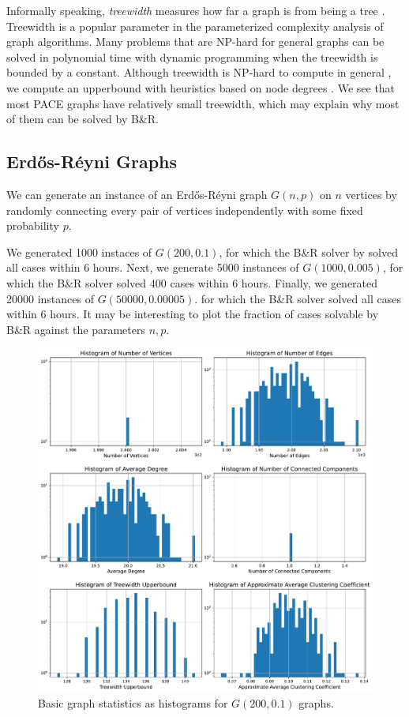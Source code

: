 \documentclass{article}
\begin{document}
Informally speaking, \emph{treewidth} measures how far a graph is from being a tree \citet{robertson1986graph}.
Treewidth is a popular parameter in the parameterized complexity analysis of graph algorithms.
Many problems that are NP-hard for general graphs can be solved in polynomial time
with dynamic programming
when the treewidth is bounded by a constant.
Although treewidth is NP-hard to compute in general \citet{treewidth_hardness},
we compute an upperbound with heuristics based on node degrees \citet{bodlaender2010treewidth}.
We see that most PACE graphs have relatively small treewidth,
which may explain why most of them can be solved by B\&R.

\subsection{Erd\H os-R\'eyni Graphs}
We can generate an instance of an Erd\H os-R\'eyni graph $G(n, p)$ on $n$ vertices
by randomly connecting every pair of vertices independently
with some fixed probability $p$.

We generated 1000 instaces of $G(200, 0.1)$,
for which the B\&R solver by \citet{kamis} solved all cases within 6 hours.
Next, we generate 5000 instances of $G(1000, 0.005)$,
for which the B\&R solver solved 400 cases within 6 hours.
Finally, we generated 20000 instances of $G(50000, 0.00005)$.
for which the B\&R solver solved all cases within 6 hours.
It may be interesting to plot the fraction of cases solvable by B\&R
against the parameters $n, p$.

\begin{figure}
     \centering
     \includegraphics[width=\textwidth]{figures/erdos_reyni_small}
     \caption{Basic graph statistics as histograms for $G(200, 0.1)$ graphs.}
     \label{fig:erdos_reyni_small}
\end{figure}
\end{document}
